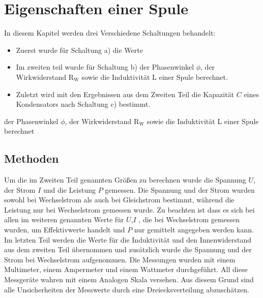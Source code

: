 \section{Eigenschaften einer Spule}
In diesem Kapitel werden  drei Verschiedene Schaltungen behandelt:
\begin{itemize}
	\item Zuerst wurde für Schaltung a) die Werte %
	\item Im zweiten teil wurde für Schaltung b) der Phasenwinkel $\phi$, der Wirkwiderstand R$_\text{W}$ sowie die Induktivität L einer Spule	 berechnet.
	\item Zuletzt wird mit den Ergebnissen aus dem Zweiten Teil die Kapazität $C$ eines Kondensators nach Schaltung c) bestimmt.
\end{itemize}

der Phasenwinkel $\phi$, der Wirkwiderstand R$_\text{W}$ sowie die Induktivität L einer Spule berechnet

\subsection{Methoden}
Um die im Zweiten Teil genannten Größen zu berechnen wurde die Spannung $U$, der Strom $I$ und die Leistung $P$ gemessen. 
Die Spannung und der Strom wurden sowohl bei Wechselstrom als auch bei Gleichstrom bestimmt, während die Leistung nur bei Wechselstrom gemessen wurde. Zu beachten ist dass es sich bei allen im weiteren genannten Werte für $U$,$I$ , die bei Wechselstrom gemessen wurden, um Effektivwerte handelt und $P$ nur gemittelt angegeben werden kann.
Im letzten Teil werden die Werte für die Induktivität und den Innenwiderstand aus dem zweiten Teil übernommen und zusätzlich wurde die Spannung und der Strom bei Wechselstrom aufgenommen.
Die Messungen wurden mit einem Multimeter, einem Ampermeter und einem Wattmeter durchgeführt.
All diese Messgeräte wahren mit einem Analogen Skala versehen. Aus diesem Grund sind alle Unsicherheiten der Messwerte durch eine Dreiecksverteilung abzuschätzen. 

